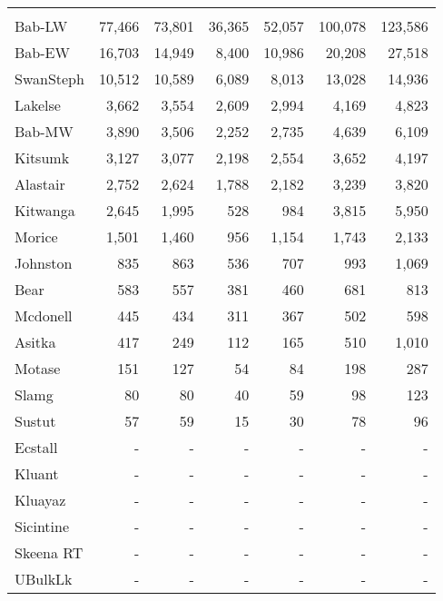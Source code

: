 \documentclass[french,11pt]{book}
\begin{document}
\begin{longtable}[t]{lrrrrrr}
\midrule\\ Bab-LW & 77,466 & 73,801 & 36,365 & 52,057 & 100,078 & 123,586\\ Bab-EW & 16,703 & 14,949 & 8,400 & 10,986 & 20,208 & 27,518\\ SwanSteph & 10,512 & 10,589 & 6,089 & 8,013 & 13,028 & 14,936\\ Lakelse & 3,662 & 3,554 & 2,609 & 2,994 & 4,169 & 4,823\\ Bab-MW & 3,890 & 3,506 & 2,252 & 2,735 & 4,639 & 6,109\\ Kitsumk & 3,127 & 3,077 & 2,198 & 2,554 & 3,652 & 4,197\\ Alastair & 2,752 & 2,624 & 1,788 & 2,182 & 3,239 & 3,820\\ Kitwanga & 2,645 & 1,995 & 528 & 984 & 3,815 & 5,950\\ Morice & 1,501 & 1,460 & 956 & 1,154 & 1,743 & 2,133\\ Johnston & 835 & 863 & 536 & 707 & 993 & 1,069\\ Bear & 583 & 557 & 381 & 460 & 681 & 813\\ Mcdonell & 445 & 434 & 311 & 367 & 502 & 598\\ Asitka & 417 & 249 & 112 & 165 & 510 & 1,010\\ Motase & 151 & 127 & 54 & 84 & 198 & 287\\ Slamg & 80 & 80 & 40 & 59 & 98 & 123\\ Sustut & 57 & 59 & 15 & 30 & 78 & 96\\ Ecstall & - & - & - & - & - & -\\ Kluant & - & - & - & - & - & -\\ Kluayaz & - & - & - & - & - & -\\ Sicintine & - & - & - & - & - & -\\ Skeena RT & - & - & - & - & - & -\\ UBulkLk & - & - & - & - & - & -\\* \end{longtable}

\endgroup{} \endgroup{}

\clearpage
\end{document}
